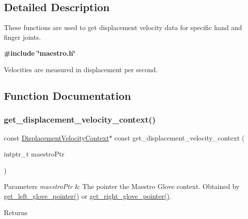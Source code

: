 \subsection{Detailed Description}
These functions are used to get displacement velocity data for specific hand and finger joints. 

{\bfseries {\ttfamily \#include \char`\"{}maestro.\+h\char`\"{}}}

Velocities are measured in displacement per second. 

\subsection{Function Documentation}
\mbox{\label{group__velocity_access_ga062167111a7cc6f51ced782fd0596042}} 
\subsubsection{\texorpdfstring{get\+\_\+displacement\+\_\+velocity\+\_\+context()}{get\_displacement\_velocity\_context()}}
{\footnotesize\ttfamily const \hyperlink{struct_displacement_velocity_context}{Displacement\+Velocity\+Context}$\ast$ const get\+\_\+displacement\+\_\+velocity\+\_\+context (\begin{DoxyParamCaption}\item[{intptr\+\_\+t}]{maestro\+Ptr }\end{DoxyParamCaption})}


\begin{DoxyParams}{Parameters}
{\em maestro\+Ptr} & The pointer the Maestro Glove context. Obtained by \hyperlink{group__glove_management_ga63ce3c99d4a8b8db851b22af9185764e}{get\+\_\+left\+\_\+glove\+\_\+pointer()} or \hyperlink{group__glove_management_ga9b8fd9d91aeac3f8da50f7a7eba0c32b}{get\+\_\+right\+\_\+glove\+\_\+pointer()}. \\
\hline
\end{DoxyParams}
\begin{DoxyReturn}{Returns}

\end{DoxyReturn}
\mbox{\label{group__velocity_access_ga5c587b9748bd964199b596c024d8ed0c}} 
